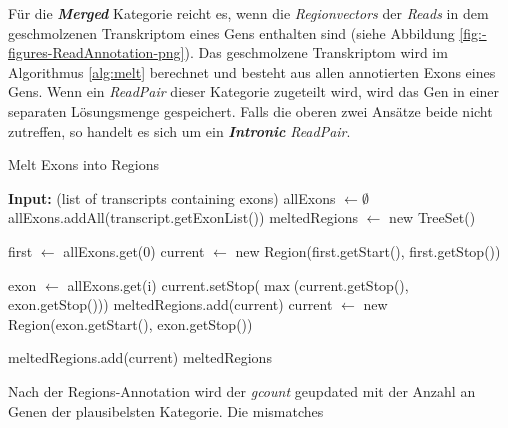 \documentclass[12pt]{article}
\begin{document}
Für die \textit{\textbf{Merged}} Kategorie reicht es, wenn die \textit{Regionvectors} der \textit{Reads} in dem geschmolzenen
Transkriptom eines Gens enthalten sind (siehe Abbildung \ref{fig:-figures-ReadAnnotation-png}). 
Das geschmolzene Transkriptom wird im Algorithmus \ref{alg:melt} berechnet und besteht aus allen annotierten Exons 
eines Gens. Wenn ein \textit{ReadPair} dieser Kategorie zugeteilt wird, wird das Gen in einer separaten Lösungsmenge
gespeichert. Falls die oberen zwei Ansätze beide nicht zutreffen, so handelt es sich um ein \textit{\textbf{Intronic}}
\textit{ReadPair}.


\begin{algorithm}[!tbp]
\caption{Melt Exons into Regions}\label{alg:melt}
\begin{algorithmic}[1]
\State \textbf{Input:}  (list of transcripts containing exons)
\State allExons $\gets \emptyset$
    \State allExons.addAll(transcript.getExonList()) 
\EndFor
\State {} 
\State meltedRegions $\gets$ new TreeSet() 

    \State first $\gets$ allExons.get(0) 
    \State current $\gets$ new Region(first.getStart(), first.getStop()) 

        \State exon $\gets$ allExons.get(i)
            \State current.setStop($\max$(current.getStop(), exon.getStop())) 
        \Else
            \State meltedRegions.add(current) 
            \State current $\gets$ new Region(exon.getStart(), exon.getStop()) 
        \EndIf
    \EndFor

    \State meltedRegions.add(current) 
\EndIf
\State \Return meltedRegions 
\end{algorithmic}
\end{algorithm}

Nach der Regions-Annotation wird der \textit{gcount} geupdated mit der Anzahl an Genen der 
plausibelsten Kategorie. Die mismatches 
\end{document}

